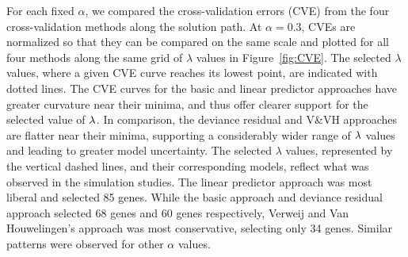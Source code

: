 
For each fixed $\alpha$, we compared the cross-validation errors (CVE) from the four cross-validation methods along the solution path. At $\alpha = 0.3$, CVEs are normalized so that they can be compared on the same scale and plotted for all four methods along the same grid of $\lambda$ values in Figure~\ref{fig:CVE}. The selected $\lambda$ values, where a given CVE curve reaches its lowest point, are indicated with dotted lines.  The CVE curves for the basic and linear predictor approaches have greater curvature near their minima, and thus offer clearer support for the selected value of $\lambda$.  In comparison, the deviance residual and V\&VH approaches are flatter near their minima, supporting a considerably wider range of $\lambda$ values and leading to greater model uncertainty.   The selected $\lambda$ values, represented by the vertical dashed lines, and their corresponding models, reflect what was observed in the simulation studies. The linear predictor approach was most liberal and selected 85 genes. While the basic approach and deviance residual approach selected 68 genes and 60 genes respectively, Verweij and Van Houwelingen's approach was most conservative, selecting only 34 genes.  Similar patterns were observed for other $\alpha$ values.

